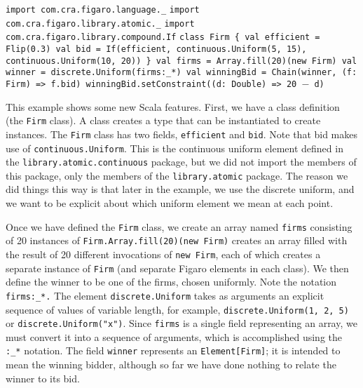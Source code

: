 \begin{flushleft}
\texttt{import com.cra.figaro.language.\_}
\newline \texttt{import com.cra.figaro.library.atomic.\_}
\newline \texttt{import com.cra.figaro.library.compound.If}
\newline
\newline \texttt{class Firm \{
\newline \tab val efficient = Flip(0.3)
\newline \tab val bid = If(efficient, continuous.Uniform(5, 15),
\newline continuous.Uniform(10, 20))
\newline \} 
\newline
\newline \texttt{val firms = Array.fill(20)(new Firm)
\newline val winner = discrete.Uniform(firms:\_*)
\newline val winningBid = Chain(winner, (f: Firm) => f.bid)
\newline winningBid.setConstraint((d: Double) => 20 $-$ d)}
}
\end{flushleft}

This example shows some new Scala features. First, we have a class definition (the \texttt{Firm} class). A class creates a type that can be instantiated to create instances. The \texttt{Firm} class has two fields, \texttt{efficient} and \texttt{bid}. Note that bid makes use of \texttt{continuous.Uniform}. This is the continuous uniform element defined in the \texttt{library.atomic.continuous} package, but we did not import the members of this package, only the members of the \texttt{library.atomic} package. The reason we did things this way is that later in the example, we use the discrete uniform, and we want to be explicit about which uniform element we mean at each point.

Once we have defined the \texttt{Firm} class, we create an array named \texttt{firms} consisting of 20 instances of \texttt{Firm.Array.fill(20)(new Firm)} creates an array filled with the result of 20 different invocations of \texttt{new Firm}, each of which creates a separate instance of  \texttt{Firm} (and separate Figaro elements in each class). We then define the winner to be one of the firms, chosen uniformly. Note the notation \texttt{firms:\_*.} The element \texttt{discrete.Uniform} takes as arguments an explicit sequence of values of variable length, for example, \texttt{discrete.Uniform(1, 2, 5)} or \texttt{discrete.Uniform("x")}. Since \texttt{firms} is a single field representing an array, we must convert it into a sequence of arguments, which is accomplished using the \texttt{:\_*} notation. The field \texttt{winner} represents an \texttt{Element[Firm]}; it is intended to mean the winning bidder, although so far we have done nothing to relate the winner to its bid.
 
